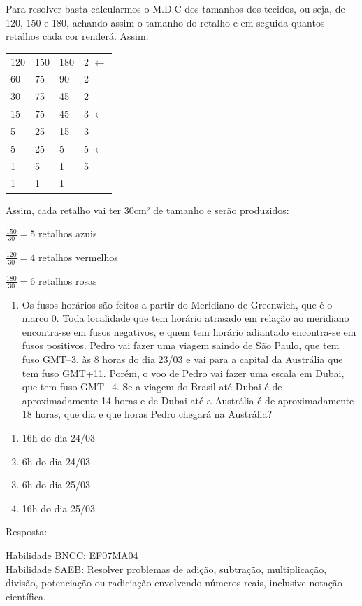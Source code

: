{{Para resolver basta calcularmos o M.D.C dos tamanhos dos tecidos, ou
seja, de 120, 150 e 180, achando assim o tamanho do retalho e em seguida
quantos retalhos cada cor renderá. Assim:

\begin{longtable}[]{@{}llll@{}}
\toprule
\endhead
120 & 150 & 180 & 2 \(\leftarrow\)\tabularnewline
60 & 75 & 90 & 2\tabularnewline
30 & 75 & 45 & 2\tabularnewline
15 & 75 & 45 & 3 \(\leftarrow\)\tabularnewline
5 & 25 & 15 & 3\tabularnewline
5 & 25 & 5 & 5 \(\leftarrow\)\tabularnewline
1 & 5 & 1 & 5\tabularnewline
1 & 1 & 1 &\tabularnewline
\bottomrule
\end{longtable}

Assim, cada retalho vai ter 30cm² de tamanho e serão produzidos:

\(\frac{150}{30} = 5\) retalhos azuis

\(\frac{120}{30} = 4\) retalhos vermelhos

\(\frac{180}{30} = 6\) retalhos rosas


\begin{enumerate}
\def\labelenumi{\arabic{enumi})}
\tightlist
\item
  Os fusos horários são feitos a partir do Meridiano de Greenwich, que é
  o marco 0. Toda localidade que tem horário atrasado em relação ao
  meridiano encontra-se em fusos negativos, e quem tem horário adiantado
  encontra-se em fusos positivos. Pedro vai fazer uma viagem saindo de
  São Paulo, que tem fuso GMT--3, às 8 horas do dia 23/03 e vai para a
  capital da Austrália que tem fuso GMT+11. Porém, o voo de Pedro vai
  fazer uma escala em Dubai, que tem fuso GMT+4. Se a viagem do Brasil
  até Dubai é de aproximadamente 14 horas e de Dubai até a Austrália é
  de aproximadamente 18 horas, que dia e que horas Pedro chegará na
  Austrália?
\end{enumerate}

\begin{enumerate}
\def\labelenumi{\alph{enumi})}
\item
  16h do dia 24/03
\item
  6h do dia 24/03
\item
  6h do dia 25/03
\item
  16h do dia 25/03
\end{enumerate}

Resposta:

Habilidade BNCC: EF07MA04\\
Habilidade SAEB: Resolver problemas de adição, subtração, multiplicação,
divisão, potenciação ou radiciação envolvendo números reais, inclusive
notação científica.

}}
